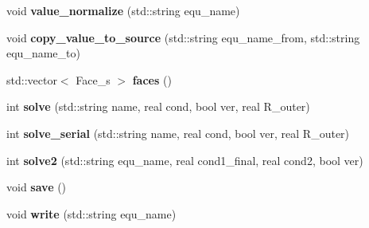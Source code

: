 \begin{DoxyCompactItemize}
\item 
\hypertarget{classProb_ad0c1ce9a1ffc181bf289aed404a2bb45}{void {\bfseries value\-\_\-normalize} (std\-::string equ\-\_\-name)}\label{classProb_ad0c1ce9a1ffc181bf289aed404a2bb45}

\item 
\hypertarget{classProb_a7bb25a9a766484c678d7e23e4b5ea4a7}{void {\bfseries copy\-\_\-value\-\_\-to\-\_\-source} (std\-::string equ\-\_\-name\-\_\-from, std\-::string equ\-\_\-name\-\_\-to)}\label{classProb_a7bb25a9a766484c678d7e23e4b5ea4a7}

\item 
\hypertarget{classProb_ac298114d98ebe5296ede77dafc3f4df3}{std\-::vector$<$ Face\-\_\-s $>$ {\bfseries faces} ()}\label{classProb_ac298114d98ebe5296ede77dafc3f4df3}

\item 
\hypertarget{classProb_a7224056a4b6649080d3e2deeab2faaad}{int {\bfseries solve} (std\-::string name, real cond, bool ver, real R\-\_\-outer)}\label{classProb_a7224056a4b6649080d3e2deeab2faaad}

\item 
\hypertarget{classProb_a2485482a64a7f4f3d7ef75ba3a4687b0}{int {\bfseries solve\-\_\-serial} (std\-::string name, real cond, bool ver, real R\-\_\-outer)}\label{classProb_a2485482a64a7f4f3d7ef75ba3a4687b0}

\item 
\hypertarget{classProb_ae50c9b74ff1590305dac1e64988a6d8b}{int {\bfseries solve2} (std\-::string equ\-\_\-name, real cond1\-\_\-final, real cond2, bool ver)}\label{classProb_ae50c9b74ff1590305dac1e64988a6d8b}

\item 
\hypertarget{classProb_a187e846a4f4eed21758efaa63ede9ec1}{void {\bfseries save} ()}\label{classProb_a187e846a4f4eed21758efaa63ede9ec1}

\item 
\hypertarget{classProb_ad790058d97221b21c665d550650c15ad}{void {\bfseries write} (std\-::string equ\-\_\-name)}\label{classProb_ad790058d97221b21c665d550650c15ad}

\end{DoxyCompactItemize}
